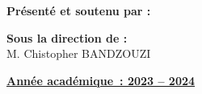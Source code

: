 \begin{titlepage}
  \vspace{2.0cm}

  \noindent
  \begin{minipage}[t]{0.45\textwidth}
    \large{
      \textbf{
        Présenté et soutenu par : \\
      }
    }
    \normalsize{
      \projetauthor
    }

  \end{minipage}
  \hfill
  \begin{minipage}[t]{0.45\textwidth}
    \raggedleft
    \large{
      \textbf{
        Sous la direction de : \\
      }
      M. Chistopher BANDZOUZI
    }
  \end{minipage}

  \vspace{3.9cm}
  \begin{center}
    \large {
      \textbf { \underline {Année académique : 2023 – 2024} }
    }

  \end{center}


\end{titlepage}
